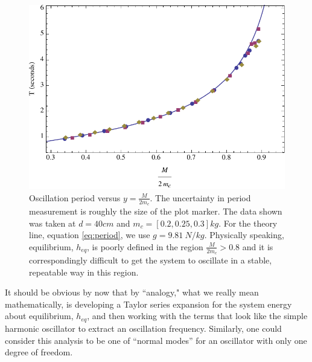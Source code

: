 \documentclass[12pt]{iopart}
\begin{document}
\begin{figure}[h!]
\centering
\includegraphics[width=\textwidth]{oscillation_T_d40.pdf}  
\caption{
Oscillation period versus $y=\frac{M}{2m_c}$.  
The uncertainty in period measurement is roughly the size of the plot marker.
The data shown was taken at $d=40cm$ and $m_c=[0.2,0.25,0.3]kg$.  For the theory line, equation \ref{eq:period}, we use $g=9.81~N/kg$.  Physically speaking, equilibrium, $h_{eq}$, is poorly defined in the region $\frac{M}{2m_c}>0.8$ and it is correspondingly difficult to get the system to oscillate in a stable, repeatable way in this region.
}
\label{fig:oscillation}
\end{figure}

It should be obvious by now that by ``analogy," what we really mean mathematically, is developing a Taylor series expansion for the system energy about equilibrium, $h_{eq}$, and then working with the terms that look like the simple harmonic oscillator to extract an oscillation frequency. Similarly, one could consider this analysis to be one of ``normal modes'' for an oscillator with only one degree of freedom.
\end{document}
